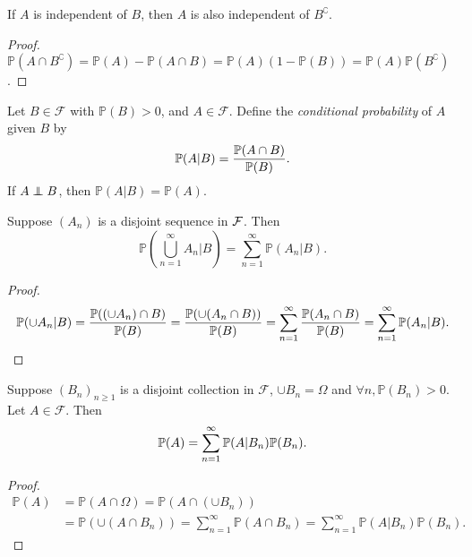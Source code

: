 \begin{claim}
    If $A$ is independent of $B$, then $A$ is also independent of $ B^\complement $.
\end{claim}
\begin{proof}
    $ \mathbb{P}(A\cap B^\complement)=\mathbb{P}(A)-\mathbb{P}(A \cap B)  =\mathbb{P}(A)(1-\mathbb{P}(B))=\mathbb{P}(A)\mathbb{P}(B^\complement) $.
\end{proof}

\begin{definition}
    Let $ B\in \mathcal{F} $ with $ \mathbb{P}(B)>0 $, and $ A\in \mathcal{F} $. Define the \textit{conditional probability} of $A$ given $B$ by 
    \[
        \mathbb{P}(A|B)=\frac{{\mathbb{P}}(A\cap B)}{{\mathbb{P}}(B)}.
    \]
    If $ A \independent B $, then $ \mathbb{P}(A|B)=\mathbb{P}(A) $.
\end{definition}

\begin{proposition}\label{prop:Countable additivity for conditional probability}
    Suppose $ (A_n) $ is a disjoint sequence in $ {\mathcal{F}} $. Then 
    \[
        \mathbb{P}\left( \bigcup_{n=1}^{\infty}A_n\Big|B \right) = \sum_{n=1}^{\infty}\mathbb{P}(A_n|B).
    \]
\end{proposition}
\begin{proof}
    \[
        \mathbb{P}(\cup A_n|B) = \frac{\mathbb{P}((\cup A_n)\cap B)}{{\mathbb{P}}(B)} = \frac{{\mathbb{P}}(\cup(A_n\cap B))}{\mathbb{P}(B)}=\sum_{n=1}^{\infty}\frac{{\mathbb{P}}(A_n\cap B)}{\mathbb{P}(B)}=\sum_{n=1}^{\infty}\mathbb{P}(A_n|B).
    \]
\end{proof}

\begin{proposition}\label{prop:Law of total probability}
    Suppose $ (B_n)_{n\ge 1} $ is a disjoint collection in $ \mathcal{F} $, $ \cup B_n=\Omega $ and $ \forall n, \mathbb{P}(B_n)>0 $. Let $ A\in \mathcal{F} $. Then 
    \[
        {\mathbb{P}}(A)=\sum_{n=1}^{\infty}\mathbb{P}(A|B_n)\mathbb{P}(B_n).
    \]
\end{proposition}
\begin{proof}
    \begin{align*}
        \mathbb{P}(A)&= \mathbb{P}(A\cap \Omega) = \mathbb{P}(A\cap (\cup B_n))\\ 
        &= \mathbb{P}(\cup (A\cap B_n)) = \sum_{n=1}^{\infty} \mathbb{P}(A\cap B_n)=\sum_{n=1}^{\infty}\mathbb{P}(A|B_n)\mathbb{P}(B_n).
    \end{align*}
\end{proof}

